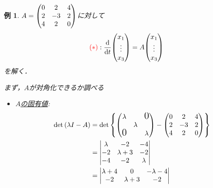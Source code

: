 \documentclass[autodetect-engine,dvipdfmx-if-dvi,ja=standard]{bxjsarticle}
\theoremstyle{mystyle1}
\theoremstyle{mystyle2}
\newtheorem{example}{例}
\newcommand{\redast}{\ensuremath{\color{red}\qty(\ast)\color{black}}}
\newcommand{\Largezero}{\ensuremath{\text{\Large{0}}}}
\begin{document}
\begin{example}
  $A=\mqty(
    0 & 2  & 4 \\
    2 & -3 & 2 \\
    4 & 2  & 0
    )$に対して\begin{align*}
    \redast:\dv{t}\mqty(
    x_1 \\\vdots\\x_3
    )=A\mqty(
    x_1 \\\vdots\\x_3
    )
  \end{align*}を解く．

  まず，$A$が対角化できるか調べる
  \begin{itemize}
    \item \underline{$A$の固有値}:\begin{align*}
            \det\qty(\lambda I-A) & =\det\qty{\mqty(
            \lambda               &                                                  & \Largezero \\
                                  & \lambda                                          &            \\
            \Largezero            &                                                  & \lambda
              )-\mqty(
            0                     & 2                                                & 4          \\
            2                     & -3                                               & 2          \\
            4                     & 2                                                & 0
            )}                                                                                    \\
                                  & =\mdet{
            \lambda               & -2                                               & -4         \\
            -2                    & \lambda+3                                        & -2         \\
            -4                    & -2                                               & \lambda
            }                                                                                     \\
                                  & =\mdet{
            \lambda+4             & 0                                                & -\lambda-4 \\
            -2                    & \lambda+3                                        & -2         \\
}
\end{align*}
\end{itemize}
\end{example}
\end{document}

